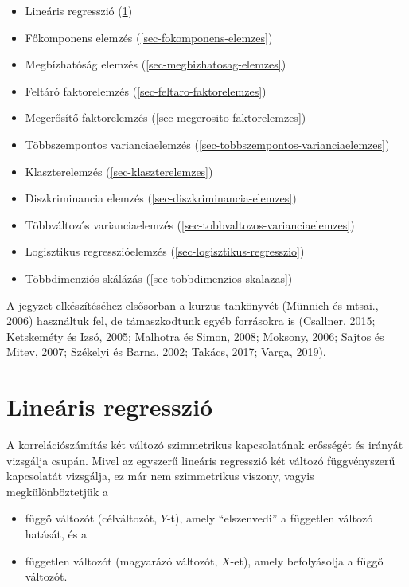 \documentclass[
  letterpaper,
]{krantz}
\providecommand{\tightlist}{%
  \setlength{\itemsep}{0pt}\setlength{\parskip}{0pt}}\usepackage{longtable,booktabs,array}
\begin{document}
\begin{itemize}
\tightlist
\item
  Lineáris regresszió (\ref{sec-linearis-regresszio})
\item
  Főkomponens elemzés (\ref{sec-fokomponens-elemzes})
\item
  Megbízhatóság elemzés (\ref{sec-megbizhatosag-elemzes})
\item
  Feltáró faktorelemzés (\ref{sec-feltaro-faktorelemzes})
\item
  Megerősítő faktorelemzés (\ref{sec-megerosito-faktorelemzes})
\item
  Többszempontos varianciaelemzés
  (\ref{sec-tobbszempontos-varianciaelemzes})
\item
  Klaszterelemzés (\ref{sec-klaszterelemzes})
\item
  Diszkriminancia elemzés (\ref{sec-diszkriminancia-elemzes})
\item
  Többváltozós varianciaelemzés
  (\ref{sec-tobbvaltozos-varianciaelemzes})
\item
  Logisztikus regresszióelemzés (\ref{sec-logisztikus-regresszio})
\item
  Többdimenziós skálázás (\ref{sec-tobbdimenzios-skalazas})
\end{itemize}

A jegyzet elkészítéséhez elsősorban a kurzus tankönyvét (Münnich és
mtsai., 2006) használtuk fel, de támaszkodtunk egyéb forrásokra is
(Csallner, 2015; Ketskeméty és Izsó, 2005; Malhotra és Simon, 2008;
Moksony, 2006; Sajtos és Mitev, 2007; Székelyi és Barna, 2002; Takács,
2017; Varga, 2019).

\mainmatter


\hypertarget{sec-linearis-regresszio}{%
\chapter{Lineáris regresszió}\label{sec-linearis-regresszio}}

A korrelációszámítás két változó szimmetrikus kapcsolatának erősségét és
irányát vizsgálja csupán. Mivel az egyszerű lineáris regresszió két
változó függvényszerű kapcsolatát vizsgálja, ez már nem szimmetrikus
viszony, vagyis megkülönböztetjük a

\begin{itemize}
\tightlist
\item
  függő változót (célváltozót, \(Y\)-t), amely ``elszenvedi'' a
  független változó hatását, és a
\item
  független változót (magyarázó változót, \(X\)-et), amely befolyásolja
  a függő változót.
\end{itemize}
\end{document}
